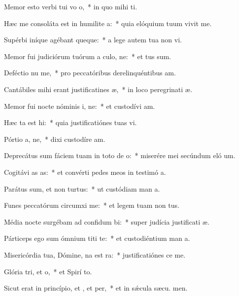 \item Memor esto verbi tui vo o,~* in quo mihi  ti.
\item Hæc me consoláta est in humilite a:~* quia elóquium tuum vivit me.
\item Supérbi iníque agébant queque:~* a lege autem tua non vi.
\item Memor fui judiciórum tuórum a culo, ne:~* et tus sum.
\item Deféctio nu me,~* pro peccatóribus derelinquéntibus  am.
\item Cantábiles mihi erant justificatines æ,~* in loco peregrinati æ.
\item Memor fui nocte nóminis i, ne:~* et custodívi  am.
\item Hæc ta est hi:~* quia justificatiónes tuas vi.
\item Pórtio a, ne,~* dixi custodíre  am.
\item Deprecátus sum fáciem tuam in toto de o:~* miserére mei secúndum eló um.
\item Cogitávi as as:~* et convérti pedes meos in testimó a.
\item Parátus sum, et non  turtus:~* ut custódiam man a.
\item Funes peccatórum circumxi  me:~* et legem tuam non  tus.
\item Média nocte surgébam ad confidum bi:~* super judícia justificati æ.
\item Párticeps ego sum ómnium titi te:~* et custodiéntium man a.
\item Misericórdia tua, Dómine, na est ra:~* justificatiónes  ce me.
\item Glória tri, et o,~* et Spirí to.
\item Sicut erat in princípio, et , et per,~* et in sǽcula sæcu. men.
